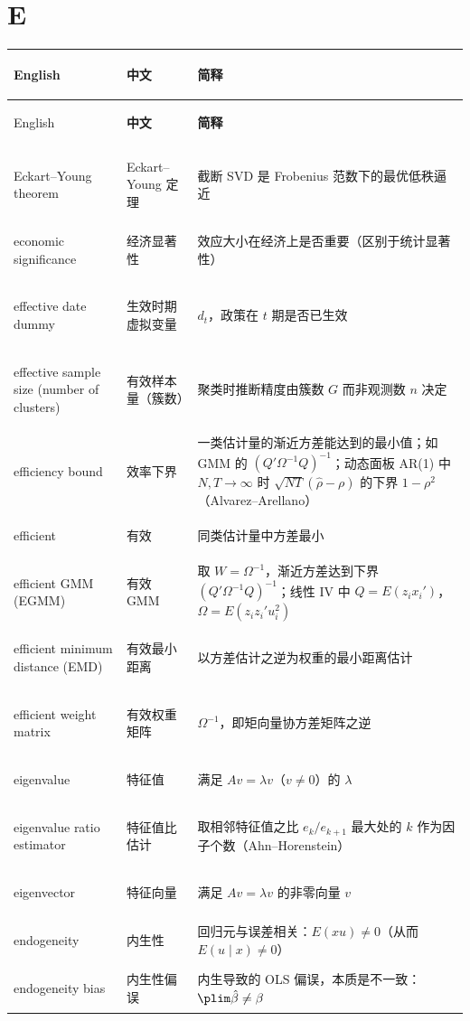 \section*{E}
\begin{longtable}{@{}>{\bfseries\boldmath\raggedright\arraybackslash}p{4.6cm}>{\raggedright\arraybackslash}p{3.2cm}>{\raggedright\arraybackslash}p{\dimexpr\textwidth-7.8cm-4\tabcolsep\relax}@{}}
\toprule
English & \textbf{中文} & \textbf{简释}\\
\midrule
\endfirsthead
\toprule
English & \textbf{中文} & \textbf{简释}\\
\midrule
\endhead
\midrule
\multicolumn{3}{r@{}}{\footnotesize\itshape （续下页）}\\
\endfoot
\bottomrule
\endlastfoot
Eckart--Young theorem & Eckart--Young 定理 & 截断 SVD 是 Frobenius 范数下的最优低秩逼近 \\
economic significance & 经济显著性 & 效应大小在经济上是否重要（区别于统计显著性） \\
effective date dummy & 生效时期虚拟变量 & $d_t$，政策在 $t$ 期是否已生效 \\
effective sample size (number of clusters) & 有效样本量（簇数） & 聚类时推断精度由簇数 $G$ 而非观测数 $n$ 决定 \\
efficiency bound & 效率下界 & 一类估计量的渐近方差能达到的最小值；如 GMM 的 $(Q'\Omega^{-1}Q)^{-1}$；动态面板 AR(1) 中 $N,T\to\infty$ 时 $\sqrt{NT}(\hat\rho-\rho)$ 的下界 $1-\rho^2$（Alvarez--Arellano） \\
efficient & 有效 & 同类估计量中方差最小 \\
efficient GMM (EGMM) & 有效 GMM & 取 $W=\Omega^{-1}$，渐近方差达到下界 $(Q'\Omega^{-1}Q)^{-1}$；线性 IV 中 $Q=E(z_ix_i')$，$\Omega=E(z_iz_i'u_i^2)$ \\
efficient minimum distance (EMD) & 有效最小距离 & 以方差估计之逆为权重的最小距离估计 \\
efficient weight matrix & 有效权重矩阵 & $\Omega^{-1}$，即矩向量协方差矩阵之逆 \\
eigenvalue & 特征值 & 满足 $Av=\lambda v$（$v\ne0$）的 $\lambda$ \\
eigenvalue ratio estimator & 特征值比估计 & 取相邻特征值之比 $e_k/e_{k+1}$ 最大处的 $k$ 作为因子个数（Ahn--Horenstein） \\
eigenvector & 特征向量 & 满足 $Av=\lambda v$ 的非零向量 $v$ \\
endogeneity & 内生性 & 回归元与误差相关：$E(xu)\ne0$（从而 $E(u\mid x)\ne0$） \\
endogeneity bias & 内生性偏误 & 内生导致的 OLS 偏误，本质是不一致：$\plim\hat\beta\ne\beta$ \\

\end{longtable}
